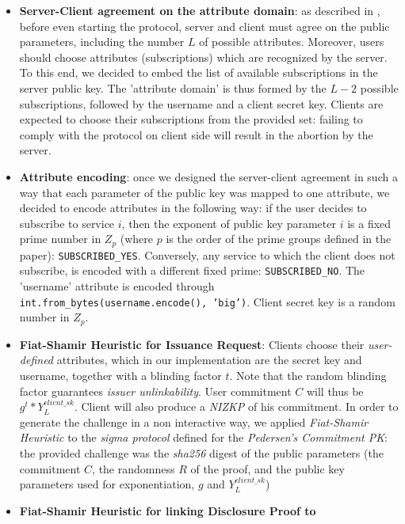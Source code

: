 \documentclass[10pt,conference,compsocconf]{IEEEtran}
\begin{document}
\begin{itemize}
    \item \textbf{Server-Client agreement on the attribute domain}: as described
    in \cite{PS_signature}, before even starting the protocol, server and client
    must agree on the public parameters, including the number $L$ of possible
    attributes. Moreover, users should choose attributes (subscriptions) which
    are recognized by the server. To this end, we decided to embed the list of
    available subscriptions in the server public key. The 'attribute domain' is thus formed by the
    $L-2$ possible subscriptions, followed by the username and a client secret key.
    Clients are expected to choose their subscriptions from the provided set:
    failing to comply with the protocol on client side will result in the
    abortion by the server.
    \item \textbf{Attribute encoding}: once we designed the server-client
    agreement in such a way that each parameter of the public key was mapped to one attribute, we decided to encode
    attributes in the following way: if the user decides to subscribe to service
    $i$, then the exponent of public key parameter $i$ is a fixed prime number in $Z_p$ (where $p$ is the order of
    the prime groups defined in the paper): \texttt{SUBSCRIBED\_YES}. Conversely, any service to which the client does
    not subscribe, is encoded with a different fixed prime:
    \texttt{SUBSCRIBED\_NO}. The 'username' attribute is encoded through
    \texttt{int.from\_bytes(username.encode(), 'big')}. Client secret key is a random number in $Z_p$.
    \item \textbf{Fiat-Shamir Heuristic for Issuance Request}: Clients choose their \textit{user-defined} attributes,
    which in our implementation are the secret key and username, together with a
    blinding factor $t$. Note that the random blinding factor guarantees
    \textit{issuer unlinkability}. User commitment $C$ will thus be
    $g^{t}*Y_{L}^{client\_sk}$. Client will also produce a \textit{NIZKP} of his commitment. In order
    to generate the challenge in a non interactive way, we applied
    \textit{Fiat-Shamir Heuristic} to the \textit{sigma protocol} defined for
    the \textit{Pedersen's Commitment PK}: the provided
    challenge was the \textit{sha256} digest of the public parameters (the
    commitment $C$, the randomness $R$ of the proof, and the public key
    parameters used for exponentiation, $g$ and $Y_{L}^{client\_sk}$)
    \item \textbf{Fiat-Shamir Heuristic for linking Disclosure Proof to
}
\end{itemize}
\end{document}
